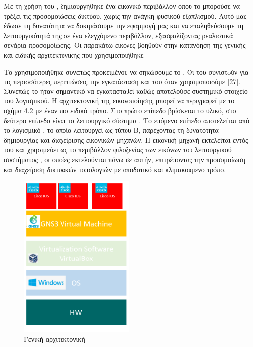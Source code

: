 Με τη χρήση του , δημιουργήθηκε ένα εικονικό περιβάλλον όπου το  μπορούσε να τρέξει τις προσομοιώσεις δικτύου, χωρίς την ανάγκη φυσικού εξοπλισμού. Αυτό μας έδωσε τη δυνατότητα να δοκιμάσουμε την εφαρμογή μας και να επαληθεύσουμε τη λειτουργικότητά της σε ένα ελεγχόμενο περιβάλλον, εξασφαλίζοντας ρεαλιστικά σενάρια προσομοίωσης.
Οι παρακάτω εικόνες βοηθούν στην κατανόηση της γενικής και ειδικής αρχιτεκτονικής που χρησιμοποιήθηκε



\FloatBarrier

Το  χρησιμοποιήθηκε συνεπώς προκειμένου να σηκώσουμε το . Οι  του  συνιστoύν για τις περισσότερες περιπτώσεις την εγκατάσταση και του  όταν χρησιμοποιoύμε [27]. Συνεπώς το  ήταν σημαντικό να εγκατασταθεί καθώς αποτελούσε συστημικό στοιχείο του  λογισμικού. Η αρχιτεκτονική της εικονοποίησης μπορεί να περιγραφεί με το σχήμα 4.2 με έναν πιο ειδικό τρόπο. Στο πρώτο επίπεδο βρίσκεται το υλικό, στο δεύτερο επίπεδο είναι το λειτουργικό σύστημα . Το επόμενο επίπεδο αποτελείται από το λογισμικό , το οποίο λειτουργεί ως  τύπου Β, παρέχοντας τη δυνατότητα δημιουργίας και διαχείρισης εικονικών μηχανών. Η εικονική μηχανή  εκτελείται εντός του  και χρησιμεύει ως το περιβάλλον φιλοξενίας των εικόνων του λειτουργικού συστήματος , οι οποίες εκτελούνται πάνω σε αυτήν, επιτρέποντας την προσομοίωση και διαχείριση δικτυακών τοπολογιών με αποδοτικό και κλιμακούμενο τρόπο.



\begin{figure}[htb]
	\centering
	\includegraphics[width=0.5\textwidth]{graphics/virtualization_architecture.PNG}
	\caption{ Γενική αρχιτεκτονική}
\end{figure}


